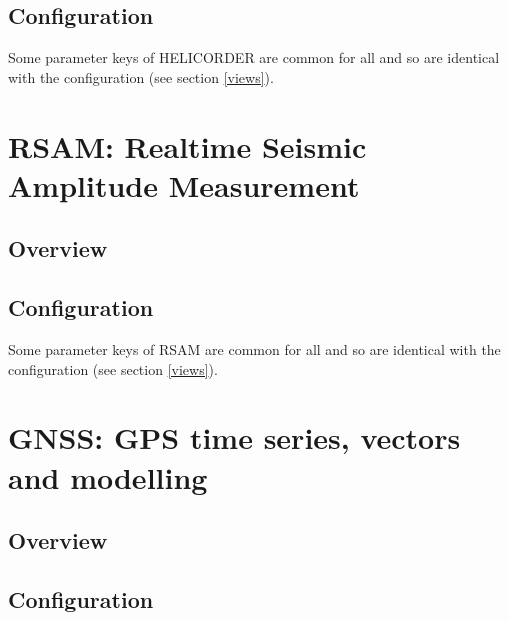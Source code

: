 \subsection{Configuration}

Some parameter keys of HELICORDER are common for all  and  so are identical with the  configuration (see section \ref{views}).




\section{RSAM: Realtime Seismic Amplitude Measurement}

\subsection{Overview}

\subsection{Configuration}

Some parameter keys of RSAM are common for all  and  so are identical with the  configuration (see section \ref{views}).




\section{GNSS: GPS time series, vectors and modelling}

\subsection{Overview}

\subsection{Configuration}

